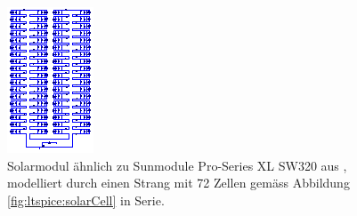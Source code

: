 \begin{figure}[h!tb]
    \centering
    \includegraphics[width=\textwidth]{images/ltspice/module-72cells-series.eps}
    \caption{%
        Solarmodul   \"ahnlich   zu   Sunmodule  Pro-Series   XL   SW320   aus
        \cite{ref:solar:sunmodulePro},  modelliert durch  einen Strang  mit 72
        Zellen gem\"ass Abbildung \ref{fig:ltspice:solarCell} in Serie.%
    }
    \label{fig:ltspice:module:cellBased:72x1}
\end{figure}


